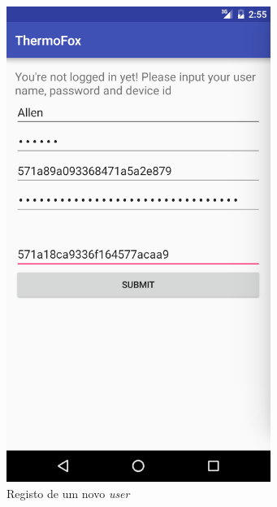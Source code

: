 \documentclass[a4paper]{article}
\begin{document}
\begin{figure}[H]
  \includegraphics[width=\linewidth]{newalarm.png}
  \caption{Registo de um novo \textit{user}}\label{fig:newalarm}
\endminipage\hfill
{}

\end{figure}
\end{document}

